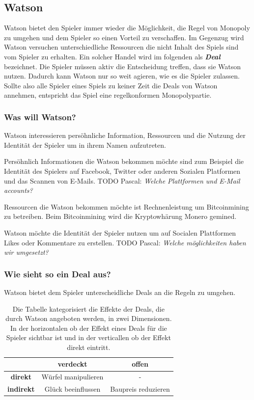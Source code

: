 \documentclass[german]{cgspaper} %
\newcommand{\todo}[1]{\textit{#1}}
\newcommand{\Pascal}[1]{\textcolor{colorPascal}{TODO Pascal:} \todo{#1} }
\newcommand{\neuerBegriff}[1]{\textbf{\textit{#1}}}
\begin{document}
\subsection{Watson}

Watson bietet den Spieler immer wieder die Möglichkeit, die Regel von Monopoly zu umgehen und dem Spieler so einen Vorteil zu verschaffen.
Im Gegenzug wird Watson versuchen unterschiedliche Ressourcen die nicht Inhalt des Spiels sind vom Spieler zu erhalten.
Ein solcher Handel wird im folgenden als \neuerBegriff{Deal} bezeichnet.
Die Spieler müssen aktiv die Entscheidung treffen, dass sie Watson nutzen.
Dadurch kann Watson nur so weit agieren, wie es die Spieler zulassen.
Sollte also alle Spieler eines Spiels zu keiner Zeit die Deals von Watson annehmen, entspricht das Spiel eine regelkonformen Monopolypartie.

\subsubsection{Was will Watson?}

Watson interessieren persöhnliche Information, Ressourcen und die Nutzung der Identität der Spieler um in ihrem Namen aufzutreten.

Persöhnlich Informationen die Watson bekommen möchte sind zum Beispiel die Identität des Spielers auf Facebook, Twitter oder anderen Sozialen Platformen und das Scannen von E-Mails.
\Pascal{Welche Plattformen und E-Mail accounts?}

Ressourcen die Watson bekommen möchte ist Rechnenleistung um Bitcoinmining zu betreiben.
Beim Bitcoinmining wird die Kryptowhärung Monero gemined.

Watson möchte die Identität der Spieler nutzen um auf Socialen Plattformen Likes oder Kommentare zu erstellen.
\Pascal{Welche möglichkeiten haben wir umgesetzt?}

\subsubsection{Wie sieht so ein Deal aus?}

Watson bietet dem Spieler unterscheidliche Deals an die Regeln zu umgehen.

\begin{table}[h]
\centering
\begin{tabular}{|c|c|c|}
\hline 
& \textbf{verdeckt} & \textbf{offen} \\
\hline
\textbf{direkt} & Würfel manipulieren & - \\
\hline
\textbf{indirekt} & Glück beeinflussen & Baupreis reduzieren \\
\hline
\end{tabular}
\caption{Die Tabelle kategorisiert die Effekte der Deals, die durch Watson angeboten werden, in zwei Dimensionen. In der horizontalen ob der Effekt eines Deals für die Spieler sichtbar ist und in der verticallen ob der Effekt direkt eintritt.}
\label{tab:effekte}
\end{table}
\end{document}
